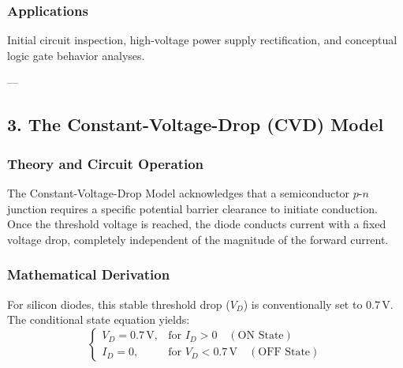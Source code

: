 \documentclass[12pt,a3paper]{article}
\begin{document}
\begin{enumerate}
\begin{tcolorbox}[enhanced,breakable,ansbox,colback=cA!4,colframe=cA,boxrule=0.8pt,arc=5pt,title={\textbf{Answer}},fonttitle=\bfseries\color{white},colbacktitle=cA]
\subsubsection*{Applications}
Initial circuit inspection, high-voltage power supply rectification, and conceptual logic gate behavior analyses.

---

\subsection*{3. The Constant-Voltage-Drop (CVD) Model}

\subsubsection*{Theory and Circuit Operation}
The Constant-Voltage-Drop Model acknowledges that a semiconductor $p\text{-}n$ junction requires a specific potential barrier clearance to initiate conduction. Once the threshold voltage is reached, the diode conducts current with a fixed voltage drop, completely independent of the magnitude of the forward current.

\subsubsection*{Mathematical Derivation}
For silicon diodes, this stable threshold drop ($V_D$) is conventionally set to $0.7\,\text{V}$. The conditional state equation yields:
\begin{equation}
    \begin{cases} 
      V_D = 0.7\,\text{V}, & \text{for } I_D > 0 \quad (\text{ON State}) \\
      I_D = 0, & \text{for } V_D < 0.7\,\text{V} \quad (\text{OFF State})
   \end{cases}
\end{equation}


\end{tcolorbox}
\end{enumerate}
\end{document}
